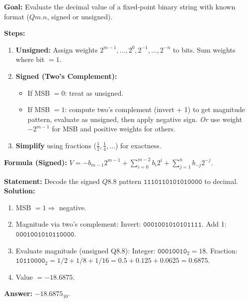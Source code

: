 \documentclass[11pt]{article}
\begin{document}
\begin{methode}
\textbf{Goal:} Evaluate the decimal value of a fixed‑point binary string with known format ($Qm.n$, signed or unsigned).\par
\textbf{Steps:}
\begin{enumerate}
    \item \textbf{Unsigned:} Assign weights $2^{m-1}, \dots, 2^0, 2^{-1}, \dots, 2^{-n}$ to bits. Sum weights where bit $=1$.
    \item \textbf{Signed (Two's Complement):}
          \begin{itemize}
              \item If MSB $= 0$: treat as unsigned.
              \item If MSB $= 1$: compute two's complement (invert + 1) to get magnitude pattern, evaluate as unsigned, then apply negative sign. \emph{Or} use weight $-2^{m-1}$ for MSB and positive weights for others.
          \end{itemize}
    \item \textbf{Simplify} using fractions ($\frac{1}{2}, \frac{1}{4}, \dots$) for exactness.
\end{enumerate}
\textbf{Formula (Signed):} $V = -b_{m-1}2^{m-1} + \sum_{i=0}^{m-2} b_i 2^i + \sum_{j=1}^{n} b_{-j} 2^{-j}$.
\end{methode}

\begin{exoresolu}
\textbf{Statement:} Decode the signed $Q8.8$ pattern $\mathtt{1110110101010000}$ to decimal.
\tcblower
\textbf{Solution:}
\begin{enumerate}
    \item MSB $= 1 \Rightarrow$ negative.
    \item Magnitude via two's complement:
        Invert: $\mathtt{0001001010101111}$.
        Add 1: $\mathtt{0001001010110000}$.
    \item Evaluate magnitude (unsigned Q8.8):
        Integer: $\mathtt{00010010}_2 = 18$.
        Fraction: $\mathtt{10110000}_2 = 1/2 + 1/8 + 1/16 = 0.5 + 0.125 + 0.0625 = 0.6875$.
    \item Value $= -18.6875$.
\end{enumerate}
\textbf{Answer:} $-18.6875_{10}$.
\end{exoresolu}
\end{document}
